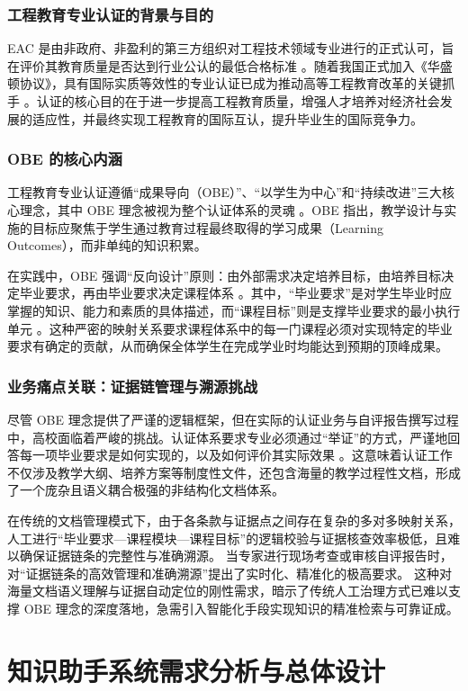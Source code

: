 \documentclass[UTF8,a4paper,zihao=-4]{ctexart}
\begin{document}
\subsubsection{工程教育专业认证的背景与目的}
EAC 是由非政府、非盈利的第三方组织对工程技术领域专业进行的正式认可，旨在评价其教育质量是否达到行业公认的最低合格标准\cite{lj__2015}
。随着我国正式加入《华盛顿协议》，具有国际实质等效性的专业认证已成为推动高等工程教育改革的关键抓手\cite{lzy__2014}
。认证的核心目的在于进一步提高工程教育质量，增强人才培养对经济社会发展的适应性，并最终实现工程教育的国际互认，提升毕业生的国际竞争力\cite{lj__2015}。

\subsubsection{OBE 的核心内涵}
工程教育专业认证遵循“成果导向（OBE）”、“以学生为中心”和“持续改进”三大核心理念，其中 OBE 理念被视为整个认证体系的灵魂
。OBE 指出，教学设计与实施的目标应聚焦于学生通过教育过程最终取得的学习成果（Learning Outcomes），而非单纯的知识积累。

在实践中，OBE 强调“反向设计”原则：由外部需求决定培养目标，由培养目标决定毕业要求，再由毕业要求决定课程体系
。其中，“毕业要求”是对学生毕业时应掌握的知识、能力和素质的具体描述，而“课程目标”则是支撑毕业要求的最小执行单元
。这种严密的映射关系要求课程体系中的每一门课程必须对实现特定的毕业要求有确定的贡献，从而确保全体学生在完成学业时均能达到预期的顶峰成果。

\subsubsection{业务痛点关联：证据链管理与溯源挑战}
尽管 OBE 理念提供了严谨的逻辑框架，但在实际的认证业务与自评报告撰写过程中，高校面临着严峻的挑战。认证体系要求专业必须通过“举证”的方式，严谨地回答每一项毕业要求是如何实现的，以及如何评价其实际效果
。这意味着认证工作不仅涉及教学大纲、培养方案等制度性文件，还包含海量的教学过程性文档，形成了一个庞杂且语义耦合极强的非结构化文档体系\cite{lzy__2014,lj__2015}。

在传统的文档管理模式下，由于各条款与证据点之间存在复杂的多对多映射关系，人工进行“毕业要求—课程模块—课程目标”的逻辑校验与证据核查效率极低，且难以确保证据链条的完整性与准确溯源。
当专家进行现场考查或审核自评报告时，对“证据链条的高效管理和准确溯源”提出了实时化、精准化的极高要求。
这种对海量文档语义理解与证据自动定位的刚性需求，暗示了传统人工治理方式已难以支撑 OBE 理念的深度落地，急需引入智能化手段实现知识的精准检索与可靠证成。
\section{知识助手系统需求分析与总体设计}
\end{document}

